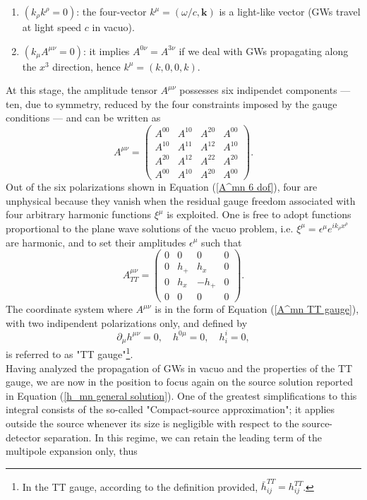 \documentclass[12pt,twoside,openany]{book}
\begin{document}
\begin{enumerate}
    \item $(k_\rho k^\rho=0)$: the four-vector $k^\mu=(\omega/c,\mathbf{k})$ is a light-like vector (GWs travel at light speed $c$ in vacuo).
    \item $(k_\mu A^{\mu\nu}=0)$: it implies $A^{0\nu}=A^{3\nu}$ if we deal with GWs propagating along the $x^3$ direction, hence $k^\mu=(k,0,0,k)$.
\end{enumerate}
At this stage, the amplitude tensor $A^{\mu\nu}$ possesses six indipendet components --- ten, due to symmetry, reduced by the four constraints imposed by the gauge conditions --- and can be written as
\begin{equation}\label{A^mn 6 dof}   
A^{\mu\nu} =
\begin{pmatrix}
A^{00} & A^{10} & A^{20} & A^{00} \\
A^{10} & A^{11} & A^{12} & A^{10} \\
A^{20} & A^{12} & A^{22} & A^{20} \\
A^{00} & A^{10} & A^{20} & A^{00}
\end{pmatrix}.
\end{equation}
Out of the six polarizations shown in Equation (\ref{A^mn 6 dof}), four are unphysical because they vanish when the residual gauge freedom associated with four arbitrary harmonic functions $\xi^\mu$ is exploited. One is free to adopt functions proportional to the plane wave solutions of the vacuo problem, i.e. $\xi^\mu=\epsilon^\mu e^{ik_\rho x^\rho}$ are harmonic, and to set their amplitudes $\epsilon^\mu$ such that 
\begin{equation}\label{A^mn TT gauge}   
A^{\mu\nu}_{TT} =
\begin{pmatrix}
0 & 0 & 0 & 0 \\
0 & h_+ & h_x & 0 \\
0 & h_x & -h_+ & 0 \\
0 & 0 & 0 & 0
\end{pmatrix}.
\end{equation}
The coordinate system where $A^{\mu\nu}$ is in the form of Equation (\ref{A^mn TT gauge}), with two indipendent polarizations only, and defined by 
\begin{equation}
    \partial_\mu h^{\mu\nu}=0, \quad h^{0\mu}=0, \quad h^i_i=0,
\end{equation}
is referred to as "TT gauge"\footnote{In the TT gauge, according to the definition provided, $\bar{h}_{ij}^{TT}=h_{ij}^{TT}$.}.\\Having analyzed the propagation of GWs in vacuo and the properties of the TT gauge, we are now in the position to focus again on the source solution reported in Equation (\ref{h_mn general solution}). One of the greatest simplifications to this integral consists of the so-called "Compact-source approximation"; it applies outside the source whenever its size is negligible with respect to the source-detector separation. In this regime, we can retain the leading term of the multipole expansion only, thus
\end{document}
